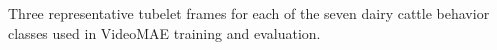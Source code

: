 \caption{Three representative tubelet frames for each of the seven dairy cattle behavior classes used in VideoMAE training and evaluation.}\label{fig:behavior-class-examples}
